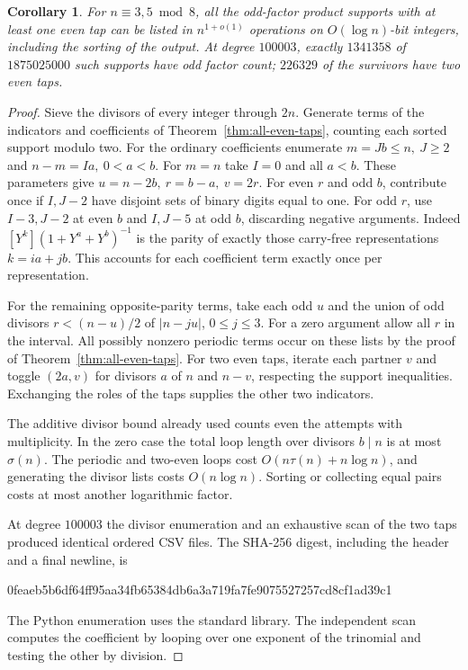 \documentclass[11pt]{article}
\newtheorem{corollary}[theorem]{Corollary}
\begin{document}
\begin{corollary}\label{cor:even-tap-enumeration}
For \(n\equiv3,5\bmod8\), all the odd-factor product supports with
at least one even tap can be listed in \(n^{1+o(1)}\) operations
on \(O(\log n)\)-bit integers, including the sorting of the output.
At degree \(100003\), exactly \(1341358\) of \(1875025000\) such
supports have odd factor count; \(226329\) of the survivors have two
even taps.
\end{corollary}
\begin{proof}
Sieve the divisors of every integer through \(2n\).
Generate terms of the indicators and coefficients of
Theorem~\ref{thm:all-even-taps}, counting each sorted support modulo two.
For the ordinary coefficients enumerate \(m=Jb\le n,\ J\ge2\)
and \(n-m=Ia,\ 0<a<b\). For \(m=n\) take \(I=0\) and all \(a<b\).
These parameters give \(u=n-2b,\ r=b-a,\ v=2r\).
For even \(r\) and odd \(b\), contribute once if \(I,J-2\)
have disjoint sets of binary digits equal to one. For odd \(r\),
use \(I-3,J-2\) at even \(b\) and \(I,J-5\) at odd \(b\), discarding
negative arguments. Indeed \([Y^k](1+Y^a+Y^b)^{-1}\) is the
parity of exactly those carry-free representations \(k=ia+jb\).
This accounts for each coefficient term exactly once per representation.

For the remaining opposite-parity terms, take each odd \(u\) and the
union of odd divisors \(r<(n-u)/2\) of \(|n-ju|\), \(0\le j\le3\).
For a zero argument allow all \(r\) in the interval. All possibly
nonzero periodic terms occur on these lists by the proof of
Theorem~\ref{thm:all-even-taps}. For two even taps, iterate each
partner \(v\) and toggle \((2a,v)\) for divisors \(a\) of \(n\)
and \(n-v\), respecting the support inequalities. Exchanging the
roles of the taps supplies the other two indicators.

The additive divisor bound already used counts even the attempts
with multiplicity. In the zero case the total loop length over
divisors \(b\mid n\) is at most \(\sigma(n)\). The periodic and
two-even loops cost \(O(n\tau(n)+n\log n)\), and generating the
divisor lists costs \(O(n\log n)\). Sorting or collecting equal
pairs costs at most another logarithmic factor.

At degree \(100003\) the divisor enumeration and an exhaustive scan
of the two taps produced identical ordered CSV files. The SHA-256
digest, including the header and a final newline, is
\begin{center}\small\ttfamily
0feaeb5b6df64ff95aa34fb65384db6a3a719fa7fe9075527257cd8cf1ad39c1
\end{center}
The Python enumeration uses the standard library. The independent
scan computes the coefficient by looping over one exponent of the
trinomial and testing the other by division.
\end{proof}
\end{document}

